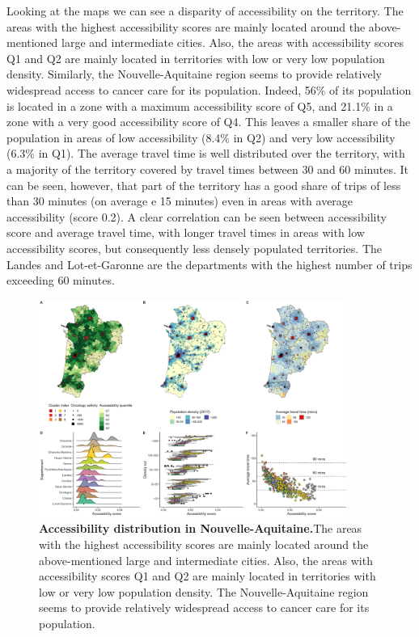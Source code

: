 Looking at the maps we can see a disparity of accessibility on the territory.
The areas with the highest accessibility scores are mainly located around the
above-mentioned large and intermediate cities. Also, the areas with
accessibility scores Q1 and Q2 are mainly located in territories with low or
very low population density. Similarly, the Nouvelle-Aquitaine region seems to
provide relatively widespread access to cancer care for its population. Indeed,
56\% of its population is located in a zone with a maximum accessibility score
of Q5, and 21.1\% in a zone with a very good accessibility score of Q4. This
leaves a smaller share of the population in areas of low accessibility (8.4\% in
Q2) and very low accessibility (6.3\% in Q1). The average travel time is well
distributed over the territory, with a majority of the territory covered by
travel times between 30 and 60 minutes. It can be seen, however, that part of
the territory has a good share of trips of less than 30 minutes (on average e 15
minutes) even in areas with average accessibility (score 0.2). A clear
correlation can be seen between accessibility score and average travel time,
with longer travel times in areas with low accessibility scores, but
consequently less densely populated territories. The Landes and Lot-et-Garonne
are the departments with the highest number of trips exceeding 60 minutes.

\begin{figure}[H]
    \includegraphics[width=0.9\textwidth]{images/camion/region_accessibility/accessibility_Nouvelle-Aquitaine.png}
    \centering
    \caption{
        \textbf{Accessibility distribution in Nouvelle-Aquitaine.}The areas with the highest accessibility scores are mainly located around the
        above-mentioned large and intermediate cities. Also, the areas with
        accessibility scores Q1 and Q2 are mainly located in territories with low or
        very low population density. The Nouvelle-Aquitaine region seems to
        provide relatively widespread access to cancer care for its population.
    }
\end{figure}

